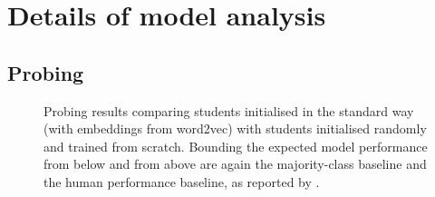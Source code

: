 \documentclass[bsc,frontabs,singlespacing,parskip,deptreport]{infthesis}
\begin{document}
\chapter{Details of model analysis}{
  \label{chap:A-model-analysis}
  \section{Probing}{
    \begin{figure}[h!tb]
      \centering
      \caption{Probing results comparing students initialised in the standard way (with embeddings from word2vec) with students initialised randomly and trained from scratch. Bounding the expected model performance from below and from above are again the majority-class baseline and the human performance baseline, as reported by \citet{Conneau_2018}.}
      \label{fig:probing-students-scratch}
    \end{figure}
  }
}
\end{document}
